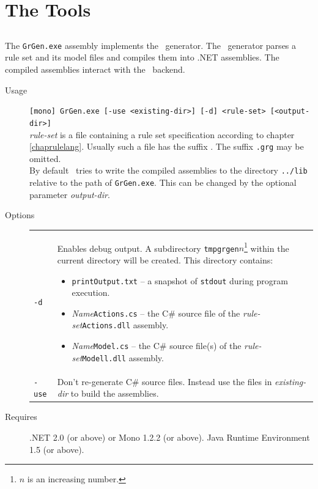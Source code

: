 \section{The Tools}

\subsection{\texttt{}}
The \texttt{GrGen.exe} assembly implements the \GrG\ generator. The \GrG\ generator parses a rule set and its model files and compiles them into .NET assemblies. The compiled assemblies interact with the \GrG\ backend.
\begin{description}
  \item[Usage] \texttt{[mono] GrGen.exe [-use <existing-dir>] [-d] <rule-set> [<output-dir>]}\\
    \emph{rule-set} is a file containing a rule set specification according to chapter \ref{chaprulelang}. Usually such a file has the suffix \texttt{}. The suffix \texttt{.grg} may be omitted.\\
By default \GrG\ tries to write the compiled assemblies to the directory \texttt{../lib} relative to the path of \texttt{GrGen.exe}. This can be changed by the optional parameter \emph{output-dir}.
  \item[Options] \mbox{} 
    \begin{tabularx}{\linewidth}{lX}
      \texttt{-d} & Enables debug output. A subdirectory \texttt{tmpgrgen$n$}\footnote{$n$ is an increasing number.} within the current directory will be created. This directory contains:
\begin{itemize}
  \item \texttt{printOutput.txt} -- a snapshot of \texttt{stdout} during program execution.
  \item \emph{Name}\texttt{Actions.cs} -- the C\# source file of the \emph{rule-set}\texttt{Actions.dll} assembly.
  \item \emph{Name}\texttt{Model.cs} -- the C\# source file(s) of the \emph{rule-set}\texttt{Modell.dll} assembly.
\end{itemize}\\
      \texttt{-use} & Don't re-generate C\# source files. Instead use the files in \emph{existing-dir} to build the assemblies.	
    \end{tabularx}
  \item[Requires] .NET 2.0 (or above) or Mono 1.2.2 (or above). Java Runtime Environment 1.5 (or above).
\end{description}

